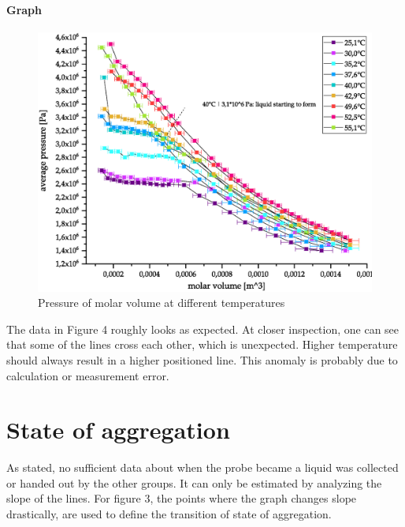 \documentclass[10pt,a4paper]{article}
\begin{document}
\paragraph{Graph}

\begin{figure}[hbt!]
\includegraphics[width=400pt, center]{Isobare.eps}
\caption{Pressure of molar volume at different temperatures}
\label{fig:length_eight_mouse}
\end{figure}

The data in Figure 4 roughly looks as expected. At closer inspection, one can see that some of the lines cross each other, which is unexpected. Higher temperature should always result in a higher positioned line. This anomaly is probably due to calculation or measurement error. 

\section{State of aggregation}

As stated, no sufficient data about when the probe became a liquid was collected or handed out by the other groups. It can only be estimated by analyzing the slope of the lines. For figure 3, the points where the graph changes slope drastically, are used to define the transition of state of aggregation.
\end{document}
